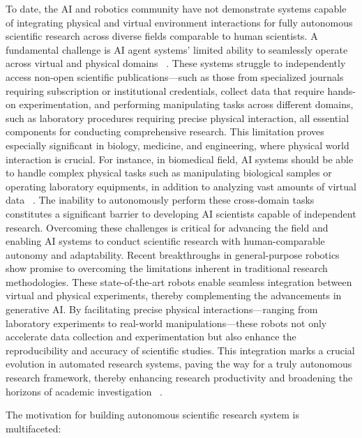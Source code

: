 To date, the AI and robotics community have not demonstrate systems capable of integrating physical and virtual environment interactions for fully autonomous scientific research across diverse fields comparable to human scientists. A fundamental challenge is AI agent systems' limited ability to seamlessly operate across virtual and physical domains ~\cite{lu2024ai, angelopoulos2024transforming}. These systems struggle to independently access non-open scientific publications—such as those from specialized journals requiring subscription or institutional credentials, collect data that require hands-on experimentation, and performing manipulating tasks across different domains, such as laboratory procedures requiring  precise physical interaction, all essential components for conducting comprehensive research. This limitation proves especially significant in biology, medicine, and engineering, where physical world interaction is crucial. For instance, in biomedical field, AI systems should be able to handle complex physical tasks such as manipulating biological samples or operating laboratory equipments, in addition to analyzing vast amounts of virtual data ~\cite{da2024advancement}. The inability to autonomously perform these cross-domain tasks constitutes a significant barrier to developing AI scientists capable of independent research. Overcoming these challenges is critical for advancing the field and enabling AI systems to conduct scientific research with human-comparable autonomy and adaptability. Recent breakthroughs in general-purpose robotics~\cite{black2024pi_0,jiang2025brs} show promise to overcoming the limitations inherent in traditional research methodologies. These state-of-the-art robots enable seamless integration between virtual and physical experiments, thereby complementing the advancements in generative AI. By facilitating precise physical interactions—ranging from laboratory experiments to real-world manipulations—these robots not only accelerate data collection and experimentation but also enhance the reproducibility and accuracy of scientific studies. This integration marks a crucial evolution in automated research systems, paving the way for a truly autonomous research framework, thereby enhancing research productivity and broadening the horizons of academic investigation ~\cite{Open-Endednesshughesposition}.



The motivation for building autonomous scientific research system is multifaceted:

